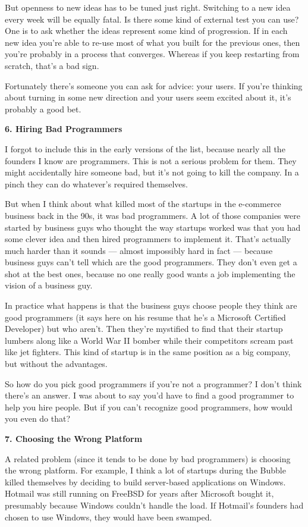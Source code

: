 \documentclass[12pt]{book}
\begin{document}
But openness to new ideas has to be tuned just right. Switching to a new
idea every week will be equally fatal. Is there some kind of external
test you can use? One is to ask whether the ideas represent some kind of
progression. If in each new idea you're able to re-use most of what you
built for the previous ones, then you're probably in a process that
converges. Whereas if you keep restarting from scratch, that's a bad
sign.

Fortunately there's someone you can ask for advice: your users. If
you're thinking about turning in some new direction and your users seem
excited about it, it's probably a good bet.

\textbf{6. Hiring Bad Programmers}

I forgot to include this in the early versions of the list, because
nearly all the founders I know are programmers. This is not a serious
problem for them. They might accidentally hire someone bad, but it's not
going to kill the company. In a pinch they can do whatever's required
themselves.

But when I think about what killed most of the startups in the
e-commerce business back in the 90s, it was bad programmers. A lot of
those companies were started by business guys who thought the way
startups worked was that you had some clever idea and then hired
programmers to implement it. That's actually much harder than it sounds
--- almost impossibly hard in fact --- because business guys can't tell
which are the good programmers. They don't even get a shot at the best
ones, because no one really good wants a job implementing the vision of
a business guy.

In practice what happens is that the business guys choose people they
think are good programmers (it says here on his resume that he's a
Microsoft Certified Developer) but who aren't. Then they're mystified to
find that their startup lumbers along like a World War II bomber while
their competitors scream past like jet fighters. This kind of startup is
in the same position as a big company, but without the advantages.

So how do you pick good programmers if you're not a programmer? I don't
think there's an answer. I was about to say you'd have to find a good
programmer to help you hire people. But if you can't recognize good
programmers, how would you even do that?

\textbf{7. Choosing the Wrong Platform}

A related problem (since it tends to be done by bad programmers) is
choosing the wrong platform. For example, I think a lot of startups
during the Bubble killed themselves by deciding to build server-based
applications on Windows. Hotmail was still running on FreeBSD for years
after Microsoft bought it, presumably because Windows couldn't handle
the load. If Hotmail's founders had chosen to use Windows, they would
have been swamped.
\end{document}
